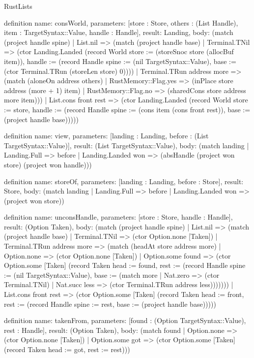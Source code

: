 \begin{lexlean}{RustLists}
\begin{semanticmodule}
definition{
  name: consWorld,
  parameters: [store : Store, others : (List Handle), item : TargetSyntax::Value, handle : Handle],
  result: Landing,
  body: (match (project handle spine)
    | List.nil => (match (project handle base)
      | Terminal.TNil => (ctor Landing.Landed (record World {store := (storeSnoc store (allocBuf item)), handle := (record Handle {spine := (nil TargetSyntax::Value), base := (ctor Terminal.TRun (storeLen store) 0)})}))
      | Terminal.TRun address more => (match (aloneOn address others)
        | RustMemory::Flag.yes => (inPlace store address (more + 1) item)
        | RustMemory::Flag.no => (sharedCons store address more item)))
    | List.cons front rest => (ctor Landing.Landed (record World {store := store, handle := (record Handle {spine := (cons item (cons front rest)), base := (project handle base)})})))
}

definition{
  name: view,
  parameters: [landing : Landing, before : (List TargetSyntax::Value)],
  result: (List TargetSyntax::Value),
  body: (match landing
    | Landing.Full => before
    | Landing.Landed won => (absHandle (project won store) (project won handle)))
}

definition{
  name: storeOf,
  parameters: [landing : Landing, before : Store],
  result: Store,
  body: (match landing | Landing.Full => before | Landing.Landed won => (project won store))
}

definition{
  name: unconsHandle,
  parameters: [store : Store, handle : Handle],
  result: (Option Taken),
  body: (match (project handle spine)
    | List.nil => (match (project handle base)
      | Terminal.TNil => (ctor Option.none [Taken])
      | Terminal.TRun address more => (match (headAt store address more)
        | Option.none => (ctor Option.none [Taken])
        | Option.some found => (ctor Option.some [Taken] (record Taken {head := found, rest := (record Handle {spine := (nil TargetSyntax::Value), base := (match more
          | Nat.zero => (ctor Terminal.TNil)
          | Nat.succ less => (ctor Terminal.TRun address less))})}))))
    | List.cons front rest => (ctor Option.some [Taken] (record Taken {head := front, rest := (record Handle {spine := rest, base := (project handle base)})})))
}

definition{
  name: takenFrom,
  parameters: [found : (Option TargetSyntax::Value), rest : Handle],
  result: (Option Taken),
  body: (match found
    | Option.none => (ctor Option.none [Taken])
    | Option.some got => (ctor Option.some [Taken] (record Taken {head := got, rest := rest})))
}


\end{semanticmodule}
\end{lexlean}
